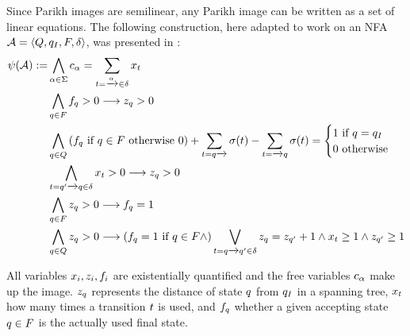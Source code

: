 \documentclass[acmsmall,review,anonymous,screen]{acmart}\settopmatter{printfolios=true,printccs=false,printacmref=true}
\theoremstyle{definition}
\begin{document}
Since Parikh images are semilinear, any Parikh image can be written as a set of linear
equations. The following construction, here adapted to work on an NFA $\mathcal{A} = \left\langle Q, q_I, F, \delta\right\rangle$, was presented in \cite{generate-parikh-image}:
\begin{equation}
\begin{aligned}
\ParikhMap(\Automaton) := 
& \AndComp{\Letter \in \Alphabet}{\LetterVar_{\Letter} = \sum_{\Transition = \FromLabelTo{}{\Letter}{} \in \Transitions} \TransitionVar_{\Transition}
}\\
& \AndComp{\State \in \AcceptingStates}{\FinalStateVar_{\State} > 0 \longrightarrow  \StateVar_{\State} > 0}\\
& \AndComp{\State \in \States}{
  \left(\FinalStateVar_{\State} \text{ if } \State \in \AcceptingStates \text{ otherwise } 0 \right) +
  \sum_{\Transition = \FromLabelTo{\State}{}{}} \Filter(\Transition) - \sum_{\Transition = \FromLabelTo{}{}{\State}} \Filter(\Transition)
= \begin{cases}
    1 \text{  if $\State = \InitialState$} \\
    0 \text{ otherwise}
  \end{cases}
}\\
& \AndComp{\Transition = \FromLabelTo{\State'}{}{\State} \in \Transitions}{
  \TransitionVar_{\Transition} > 0 \longrightarrow \StateVar_{\State} > 0
} \\
& \AndComp{\State \in F}{
  \StateVar_{\State} > 0 \longrightarrow \FinalStateVar_{\State} = 1
} \\
&\AndComp{\State \in \States}{
  \StateVar_{\State} > 0 \longrightarrow
  \left(\FinalStateVar_{\State} = 1 \text{ if } \State \in \AcceptingStates \land \right) \OrComp{\Transition = \FromLabelTo{\State}{}{\State'} \in \Transitions}{
    \StateVar_{\State} = \StateVar_{\State'} + 1 \land 
    \TransitionVar_{\Transition} \geq 1 \land
  \StateVar_{\State'} \geq 1
    }
}
\end{aligned}
\label{eq:generate-parikh}
\end{equation}

All variables $x_i, z_i, f_i$ are
existentially quantified and the free variables $c_\alpha$ make up the
image. $z_q$ represents the distance of state $q$ from
$q_I$ in a spanning tree, $x_t$ how many times
a transition $t$ is used, and $f_q$ whether a given
accepting state $q \in F$ is the actually used final state.
\end{document}
